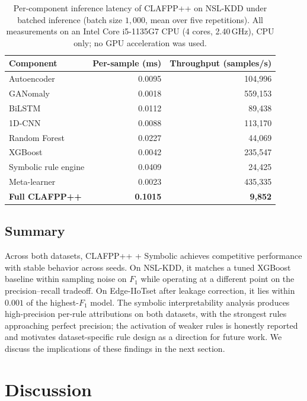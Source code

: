 \documentclass[pdflatex,sn-mathphys-num]{sn-jnl}
\theoremstyle{thmstyleone}
\theoremstyle{thmstyletwo}
\theoremstyle{thmstylethree}
\begin{document}
\begin{table}[t]
\caption{Per-component inference latency of CLAFPP++ on NSL-KDD under batched
inference (batch size $1{,}000$, mean over five repetitions). All measurements
on an Intel Core i5-1135G7 CPU (4 cores, 2.40\,GHz), CPU only; no GPU acceleration
was used.}
\label{tab:latency}
\centering
\begin{tabular}{@{}lrr@{}}
\toprule
Component & Per-sample (ms) & Throughput (samples/s) \\
\midrule
Autoencoder            & 0.0095 & 104{,}996 \\
GANomaly               & 0.0018 & 559{,}153 \\
BiLSTM                 & 0.0112 &  89{,}438 \\
1D-CNN                 & 0.0088 & 113{,}170 \\
Random Forest          & 0.0227 &  44{,}069 \\
XGBoost                & 0.0042 & 235{,}547 \\
Symbolic rule engine   & 0.0409 &  24{,}425 \\
Meta-learner           & 0.0023 & 435{,}335 \\
\midrule
\textbf{Full CLAFPP++} & \textbf{0.1015} & \textbf{9{,}852} \\
\bottomrule
\end{tabular}
\end{table}

\subsection{Summary}\label{sec:results-summary}

Across both datasets, CLAFPP++ + Symbolic achieves competitive performance with stable behavior across seeds. On NSL-KDD, it matches a tuned XGBoost baseline within sampling noise on $F_1$ while operating at a different point on the precision--recall tradeoff. On Edge-IIoTset after leakage correction, it lies within $0.001$ of the highest-$F_1$ model. The symbolic interpretability analysis produces high-precision per-rule attributions on both datasets, with the strongest rules approaching perfect precision; the activation of weaker rules is honestly reported and motivates dataset-specific rule design as a direction for future work. We discuss the implications of these findings in the next section.

\section{Discussion}\label{sec:discussion}
\end{document}
